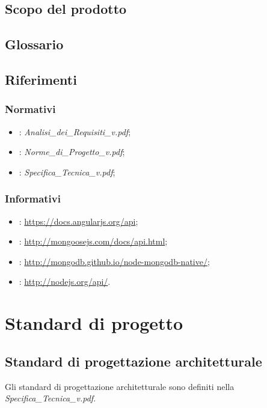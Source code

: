 \subsection{Scopo del prodotto}
\Prodotto{}

\subsection{Glossario}
\Glossario{}

\subsection{Riferimenti}

\subsubsection{Normativi}
\begin{itemize}
\item {}: \emph{Analisi\_{}dei\_{}Requisiti\_{}v\versioneAnalisiDeiRequisiti{}.pdf};
\item {}: \emph{Norme\_{}di\_{}Progetto\_{}v\versioneNormeDiProgetto{}.pdf};
\item {}: \emph{Specifica\_{}Tecnica\_{}v\versioneNormeDiProgetto{}.pdf};
\end{itemize}

\subsubsection{Informativi}
\begin{itemize}
\item {}: \url{https://docs.angularjs.org/api};
\item {}: \url{http://mongoosejs.com/docs/api.html};
\item {}: \url{http://mongodb.github.io/node-mongodb-native/};
\item {}: \url{http://nodejs.org/api/}.
\end{itemize}

\newpage
\section{Standard di progetto}
\subsection{Standard di progettazione architetturale}
Gli standard di progettazione architetturale sono definiti nella \emph{Specifica\_{}Tecnica\_{}v\versioneSpecificaTecnica{}.pdf}.

